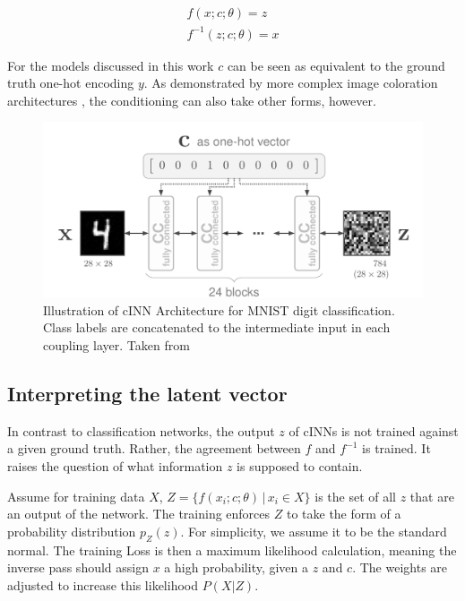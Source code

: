 \documentclass[final]{cvpr}
\begin{document}
\begin{equation} \label{eq:cINN}
\begin{split}
		f(x;c;\theta) 		= z \\
		f^{-1}(z;c;\theta) 	= x
\end{split}
\end{equation}

For the models discussed in this work $c$ can be seen as equivalent to the ground truth one-hot encoding $y$. As demonstrated by more complex image coloration architectures \cite{main_paper_CINN}, the conditioning can also take other forms, however.

\begin{figure}[t]
	\begin{center}
		\includegraphics[width=0.8\linewidth]{./figs/cINN_MNIST_model.png}
	\end{center}
	\caption{Illustration of cINN Architecture for MNIST digit classification. Class labels are concatenated to the intermediate input in each coupling layer. Taken from \cite{main_paper_CINN}}
	\label{fig:cINN_concept}
\end{figure}

\subsection{Interpreting the latent vector}
In contrast to classification networks, the output $z$ of cINNs is not trained against a given ground truth. Rather, the agreement between $f$ and $f^{-1}$ is trained. It raises the question of what information $z$ is supposed to contain.

Assume for training data $X$, $Z = \{f(x_i;c;\theta) \,|\, x_i \in X\}$ is the set of all $z$ that are an output of the network. The training enforces $Z$ to take the form of a probability distribution $p_Z(z)$. For simplicity, we assume it to be the standard normal. The training Loss is then a maximum likelihood calculation, meaning the inverse pass should assign $x$ a high probability, given a $z$ and $c$. The weights are adjusted to increase this likelihood $P(X|Z)$.
\end{document}
